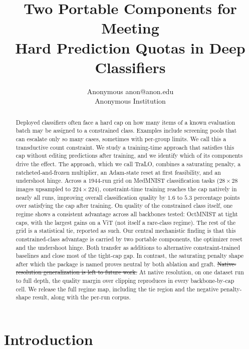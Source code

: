 \documentclass[10pt]{article}
\title{Two Portable Components for Meeting\\
Hard Prediction Quotas in Deep Classifiers}
\author{\name Anonymous \email anon@anon.edu \\
      \addr Anonymous Institution}
\newcommand{\del}[1]{{\color{red}\sout{#1}}}
\begin{document}
\maketitle

\begin{abstract}
Deployed classifiers often face a hard cap on how many items of a known
evaluation batch may be assigned to a constrained class. Examples include
screening pools that can escalate only so many cases, sometimes with
per-group limits. We call this a transductive count constraint. We study
a training-time approach that satisfies this cap without editing
predictions after training, and we identify which of its components
drive the effect. The approach, which we call TraLO, combines a
saturating penalty, a ratcheted-and-frozen multiplier, an Adam-state
reset at first feasibility, and an undershoot hinge. Across a $1944$-run
grid on MedMNIST classification tasks ($28\times 28$ images upsampled to
$224\times 224$), constraint-time training reaches the cap natively in
nearly all runs, improving overall classification quality by $1.6$ to
$5.3$ percentage points over satisfying the cap after training. On
quality of the constrained class itself, one regime shows a consistent
advantage across all backbones tested: OctMNIST at tight caps, with the
largest gains on a ViT (not itself a rare-class regime). The rest of
the grid is a statistical tie, reported as such. Our central
mechanistic finding is that this constrained-class advantage is carried
by two portable components, the optimizer reset and the undershoot
hinge. Both transfer as additions to alternative constraint-trained
baselines and close most of the tight-cap gap. In contrast, the
saturating penalty shape after which the package is named proves neutral
by both ablation and graft. \del{Native-resolution generalization is left to
future work.}
{\color{blue}At native resolution, on one dataset run to full depth, the
quality margin over clipping reproduces in every backbone-by-cap cell.}
We release the full regime map, including the tie region
and the negative penalty-shape result, along with the per-run corpus.
\end{abstract}

\section{Introduction}
\label{sec:intro}
\end{document}
